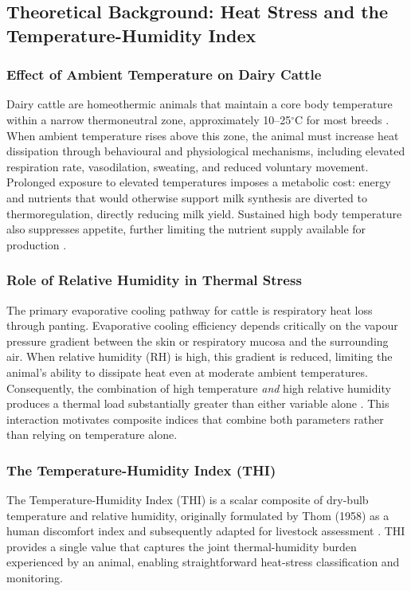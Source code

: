\documentclass[conference]{IEEEtran}
\begin{document}
	\subsection{Theoretical Background: Heat Stress and the Temperature-Humidity Index}

	\subsubsection{Effect of Ambient Temperature on Dairy Cattle}
	Dairy cattle are homeothermic animals that maintain a core body temperature within a narrow thermoneutral zone, approximately 10--25$^\circ$C for most breeds \cite{ref14}. When ambient temperature rises above this zone, the animal must increase heat dissipation through behavioural and physiological mechanisms, including elevated respiration rate, vasodilation, sweating, and reduced voluntary movement. Prolonged exposure to elevated temperatures imposes a metabolic cost: energy and nutrients that would otherwise support milk synthesis are diverted to thermoregulation, directly reducing milk yield. Sustained high body temperature also suppresses appetite, further limiting the nutrient supply available for production \cite{ref15}.

	\subsubsection{Role of Relative Humidity in Thermal Stress}
	The primary evaporative cooling pathway for cattle is respiratory heat loss through panting. Evaporative cooling efficiency depends critically on the vapour pressure gradient between the skin or respiratory mucosa and the surrounding air. When relative humidity (RH) is high, this gradient is reduced, limiting the animal's ability to dissipate heat even at moderate ambient temperatures. Consequently, the combination of high temperature \textit{and} high relative humidity produces a thermal load substantially greater than either variable alone \cite{ref14}. This interaction motivates composite indices that combine both parameters rather than relying on temperature alone.

	\subsubsection{The Temperature-Humidity Index (THI)}
	The Temperature-Humidity Index (THI) is a scalar composite of dry-bulb temperature and relative humidity, originally formulated by Thom (1958) as a human discomfort index and subsequently adapted for livestock assessment \cite{ref14}. THI provides a single value that captures the joint thermal-humidity burden experienced by an animal, enabling straightforward heat-stress classification and monitoring.
\end{document}
